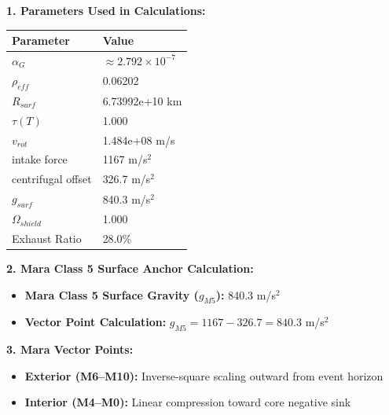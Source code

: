 \documentclass[11pt, a4paper]{article}
\begin{document}
\vspace{0.5em}
\noindent \textbf{1. Parameters Used in Calculations:}
\begin{center}
  \begin{tabular}{|l|l|}
    \hline
    \textbf{Parameter} & \textbf{Value} \\ \hline
    $\alpha_G$ & $\approx 2.792 \times 10^{-7}$ \\ \hline
    $\rho_{eff}$ & 0.06202 \\ \hline
    $R_{surf}$ & 6.73992e+10 km \\ \hline
    $\tau(T)$ & 1.000 \\ \hline
    $v_{rot}$ & 1.484e+08 m/s \\ \hline
    intake force & 1167 m/s$^2$ \\ \hline
    centrifugal offset & 326.7 m/s$^2$ \\ \hline
    $g_{surf}$ & 840.3 m/s$^2$ \\ \hline
    $\Omega_{shield}$ & 1.000 \\ \hline
    Exhaust Ratio & 28.0\% \\ \hline
  \end{tabular}
\end{center}

\vspace{0.5em}
\noindent \textbf{2. Mara Class 5 Surface Anchor Calculation:}
\begin{itemize}
  \item \textbf{Mara Class 5 Surface Gravity ($g_{M5}$):} 840.3 m/s$^2$
  \item \textbf{Vector Point Calculation:} $g_{M5} = 1167 - 326.7 = 840.3$ m/s$^2$
\end{itemize}

\vspace{0.5em}
\noindent \textbf{3. Mara Vector Points:}
\begin{itemize}
  \item \textbf{Exterior (M6--M10):} Inverse-square scaling outward from event horizon
  \item \textbf{Interior (M4--M0):} Linear compression toward core negative sink
\end{itemize}
\end{document}
